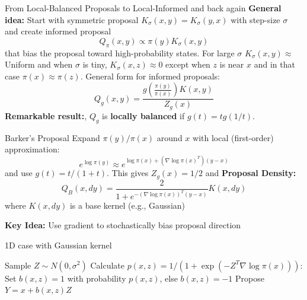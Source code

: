 \begin{frame}{From Local-Balanced Proposals to Local-Informed \tiny and back again}
	\textbf{General idea:} Start with symmetric proposal $K_\sigma(x,y) =K_\sigma(y,x)$ 
	with step-size $\sigma$ and create informed proposal 
	$$Q_{\pi}(x,y) \propto \pi(y)K_{\sigma}(x,y)$$ 
	that bias the proposal toward high-probability states. For large $\sigma$ $K_\sigma(x,y) \approx$ Uniform
	and when $\sigma$ is tiny, $K_\sigma(x,z) \approx 0$ except when $z$ is near $x$ and in
	that case $\pi(x) \approx  \pi(z)$. General form for informed proposals:
	$$Q_{g}(x,y) = \frac{g\left( \frac{\pi(y)}{\pi(x)}  \right)K(x,y)}{Z_g(x)}   $$ 
	\textbf{Remarkable result:}, $Q_g$ is \textbf{locally balanced} if $g(t) = tg(1/t)$.
\end{frame}

\begin{frame}{Barker's Proposal}
	Expand $\pi(y)/\pi(x)$ around $x$ with local (first-order) approximation: 
	$$e^{\log\pi(y)}  \approx e^{\log\pi(x)+  (\nabla\log\pi(x)^T)(y-x) }$$
	and use $g(t) = t/(1+t)$. This gives $Z_g(x) = 1/2$
	and \textbf{Proposal Density:} 
	$$Q_B(x, dy) = \frac{2}{1 + e^{-(\nabla\log\pi(x))^T(y-x)}} K(x, dy)$$
	where $K(x, dy)$ is a base kernel (e.g., Gaussian)

	\textbf{Key Idea:} Use gradient to stochastically bias proposal direction

	\begin{algorithm}[H]
		\caption{1D case with Gaussian kernel}
		\begin{algorithmic}
			\STATE Sample $Z \sim N(0, \sigma^2)$
			\STATE Calculate $p(x, z) = 1/(1 + \exp(-Z^T\nabla\log\pi(x)))$:
			\STATE Set $b(x,z) = 1$ with probability $p(x,z)$, else $b(x,z) = -1$
			\STATE Propose $Y = x + b(x,z)Z$
		\end{algorithmic}
	\end{algorithm}
\end{frame}

